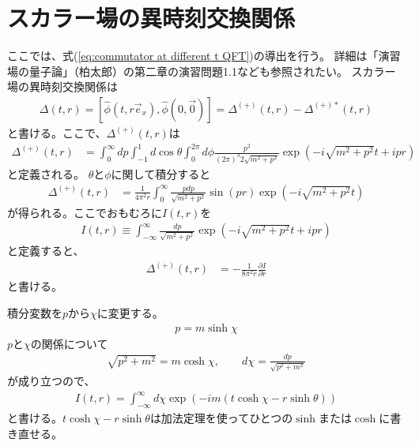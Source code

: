 \documentclass[10pt,a4paper]{jarticle}
\begin{document}
\section{スカラー場の異時刻交換関係}\label{sec:commutator at different t}
ここでは、式(\ref{eq:commutator at different t QFT})の導出を行う。
詳細は「演習場の量子論」（柏太郎）の第二章の演習問題1.1なども参照されたい。
%
スカラー場の異時刻交換関係は
\begin{align}
\Delta(t,r) = [\hat\phi(t,r \vec e_x), \hat\phi(0,\vec 0)] = \Delta^{(+)}(t,r) - \Delta^{(+)*}(t,r)
\end{align}
と書ける。ここで、$\Delta^{(+)}(t,r)$は
\begin{align}
\Delta^{(+)}(t,r)
&= \int_0^\infty dp \int_{-1}^1 d\cos\theta \int_0^{2\pi} d\phi \frac{p^2}{(2\pi)^3 2 \sqrt{m^2 + p^2}} \exp\left( -i \sqrt{m^2 + p^2} t + i p r  \right)
\end{align}
と定義される。
$\theta$と$\phi$に関して積分すると
\begin{align}
\Delta^{(+)}(t,r)
&= \frac{1}{4\pi^2 r} \int_0^\infty \frac{p dp}{\sqrt{m^2 + p^2}} \sin(pr) \exp\left( -i \sqrt{m^2 + p^2} t \right)
\end{align}
が得られる。ここでおもむろに$I(t,r)$を
\begin{align}
I(t,r) \equiv \int_{-\infty}^\infty \frac{dp}{\sqrt{m^2 + p^2}} \exp\left( -i \sqrt{m^2 + p^2} t + ipr \right)
\end{align}
と定義すると、
\begin{align}
\Delta^{(+)}(t,r)
&= -\frac{1}{8\pi^2 r} \frac{\partial I}{\partial r} 
\end{align}
と書ける。

積分変数を$p$から$\chi$に変更する。
\begin{align}
p = m \sinh \chi
\end{align}
$p$と$\chi$の関係について
\begin{align}
\sqrt{p^2 + m^2} = m \cosh \chi, \qquad
d\chi = \frac{dp}{\sqrt{p^2+ m^2}}
\end{align}
が成り立つので、
\begin{align}
I(t,r) = \int_{-\infty}^\infty d\chi \exp\left( -im(t\cosh\chi - r\sinh\theta) \right)
\end{align}
と書ける。$t\cosh\chi - r\sinh\theta$は加法定理を使ってひとつの$\sinh$または$\cosh$に書き直せる。
\end{document}
